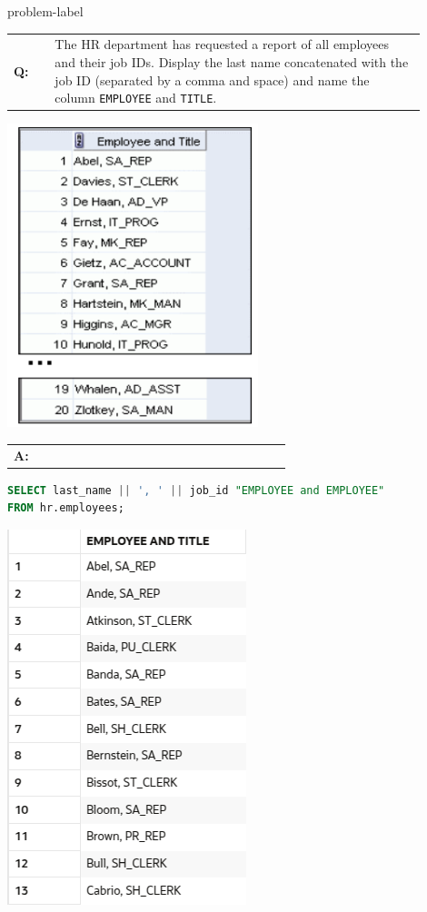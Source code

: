 \begin{problem}{}{problem-label}

\begin{tabular}{@{}l p{0.9\linewidth}@{}}
  \textbf{Q:} & The HR department has requested a report of all employees and their job IDs. Display the last name concatenated with the job ID (separated by a comma and space) and name the column
\texttt{EMPLOYEE} and \texttt{TITLE}.
\end{tabular}

\begin{center}
  \includegraphics[scale=0.7]{images/c1q9.png}
\end{center}

\begin{tabular}{@{}l p{0.9\linewidth}@{}}
  \textbf{A:} &
\end{tabular}

\begin{lstlisting}[language=SQL]
SELECT last_name || ', ' || job_id "EMPLOYEE and EMPLOYEE"
FROM hr.employees;
\end{lstlisting}

\begin{center}
  \includegraphics[scale=0.6]{images/c1a11.png}
\end{center}

\end{problem}


